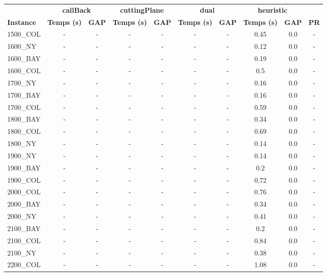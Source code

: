 \documentclass[main.tex]{subfiles}
\begin{document}
\begin{center}
\renewcommand{\arraystretch}{1.4} 
 \begin{tabular}{lccccccccc}
	\hline
 & \multicolumn{2}{c}{\textbf{callBack}} & \multicolumn{2}{c}{\textbf{cuttingPlane}} & \multicolumn{2}{c}{\textbf{dual}} & \multicolumn{2}{c}{\textbf{heuristic}}\\
\textbf{Instance}  & \textbf{Temps (s)} & \textbf{GAP} & \textbf{Temps (s)} & \textbf{GAP} & \textbf{Temps (s)} & \textbf{GAP} & \textbf{Temps (s)} & \textbf{GAP} & \textbf{PR} \\\hline

1500\_COL & - & - 
 & - & - 
 & - & - 
 & 0.45 & 0.0 & - \\
1600\_NY & - & - 
 & - & - 
 & - & - 
 & 0.12 & 0.0 & - \\
1600\_BAY & - & - 
 & - & - 
 & - & - 
 & 0.19 & 0.0 & - \\
1600\_COL & - & - 
 & - & - 
 & - & - 
 & 0.5 & 0.0 & - \\
1700\_NY & - & - 
 & - & - 
 & - & - 
 & 0.16 & 0.0 & - \\
1700\_BAY & - & - 
 & - & - 
 & - & - 
 & 0.16 & 0.0 & - \\
1700\_COL & - & - 
 & - & - 
 & - & - 
 & 0.59 & 0.0 & - \\
1800\_BAY & - & - 
 & - & - 
 & - & - 
 & 0.34 & 0.0 & - \\
1800\_COL & - & - 
 & - & - 
 & - & - 
 & 0.69 & 0.0 & - \\
1800\_NY & - & - 
 & - & - 
 & - & - 
 & 0.14 & 0.0 & - \\
1900\_NY & - & - 
 & - & - 
 & - & - 
 & 0.14 & 0.0 & - \\
1900\_BAY & - & - 
 & - & - 
 & - & - 
 & 0.2 & 0.0 & - \\
1900\_COL & - & - 
 & - & - 
 & - & - 
 & 0.72 & 0.0 & - \\
2000\_COL & - & - 
 & - & - 
 & - & - 
 & 0.76 & 0.0 & - \\
2000\_BAY & - & - 
 & - & - 
 & - & - 
 & 0.34 & 0.0 & - \\
2000\_NY & - & - 
 & - & - 
 & - & - 
 & 0.41 & 0.0 & - \\
2100\_BAY & - & - 
 & - & - 
 & - & - 
 & 0.2 & 0.0 & - \\
2100\_COL & - & - 
 & - & - 
 & - & - 
 & 0.84 & 0.0 & - \\
2100\_NY & - & - 
 & - & - 
 & - & - 
 & 0.38 & 0.0 & - \\
2200\_COL & - & - 
 & - & - 
 & - & - 
 & 1.08 & 0.0 & - \\

\end{tabular}
\end{center}
\end{document}
